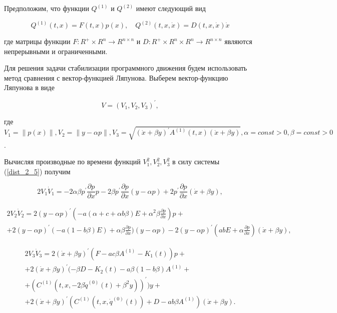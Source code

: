 Предположим, что функции $Q^{(1)}$ и $Q^{(2)}$ имеют следующий вид

\begin{equation}
Q^{(1)}(t, x) = F(t, x)p(x), \quad Q^{(2)}(t, x, \dot x) = D(t, x, \dot x) \dot x
\end{equation}

где матрицы функции $F: R^{+} \times R^{n} \to R^{n \times n}$ и $D : R^{+} \times R^{n} \times R^{n} \to R^{n \times n}$ являются непрерывными и ограниченными.

Для решения задачи стабилизации программного движения будем использовать метод сравнения с вектор-функцией Ляпунова. Выберем вектор-функцию Ляпунова в виде

\begin{equation}
V = (V_1, V_2, V_3)^{'}, \label{lap_vect_2_5}
\end{equation}

где $V_1 = \| p(x) \|, V_2 = \| y - \alpha p \|, V_3 = \sqrt{(\dot x + \beta y)^{'} A^{(1)}(t, x) (\dot x + \beta y)}, \alpha = const > 0, \beta = const > 0$. 

Вычисляя производные по времени функций $V_1^2, V_2^2, V_3^2$ в силу системы (\ref{dist_2_5}) получим

\begin{equation*}
2 V_1 \dot V_1 = - 2 \alpha \beta p^{'} \frac{\partial p}{\partial x} p - 2 \beta p^{'} \frac{\partial p}{\partial x} (y - \alpha p) + 2 p^{'} \frac{\partial p}{\partial x} (\dot x + \beta y), 
\end{equation*}

\begin{equation*}
\begin{array}{l}
2 V_2 \dot V_2 = 2 (y - \alpha p)^{'} (- a (\alpha + c + \alpha b \beta) E + \alpha^2 \beta \frac{\partial p}{\partial x}) p + \\ +2 (y - \alpha p)^{'} (- a (1 - b \beta) E) + \alpha \beta \frac{\partial p}{\partial x}) (y - \alpha p) - 2 (y - \alpha p)^{'} (abE + \alpha \frac{\partial p}{\partial x}) (\dot x + \beta y),
\end{array}
\end{equation*}

\begin{equation*}
\begin{array}{l}
2 V_3 \dot V_3 = 2 (\dot x + \beta y)^{'} (F - ac\beta A^{(1)} - K_1(t)) p + \\ + 2 (\dot x + \beta y)^{'} (- \beta D - K_2 (t) - a \beta (1 - b \beta) A^{(1)} + \\ + (C^{(1)}(t, x, -2 \beta \dot q^{(0)}(t) + \beta^2 y) )^{'}) y + \\ + 2 (\dot x + \beta y)^{'} (C^{(1)}(t, x, \dot q^{(0)}(t)) + D - a b \beta A^{(1)}) (\dot x + \beta y).
\end{array}
\end{equation*}

